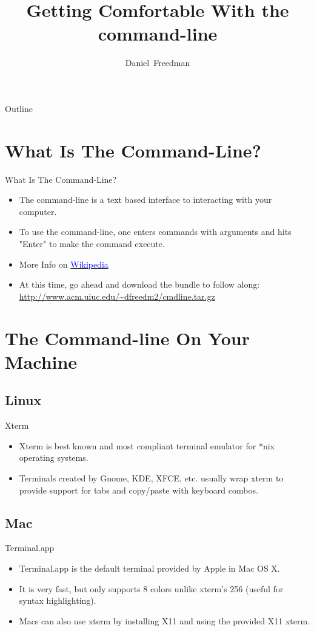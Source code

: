 \documentclass[10pt]{beamer}
\title[Getting Comfortable With the command-line]
{Getting Comfortable With the command-line}
\author[ACM Student Lecture Series]{Daniel~Freedman}
\date[September 14th, 2010]
\begin{document}
\begin{frame}
  \titlepage
\end{frame}

\begin{frame}[shrink]{Outline}
  \tableofcontents
\end{frame}

\section{What Is The Command-Line?}
\begin{frame}{What Is The Command-Line?}
  \begin{itemize}
  \item The command-line is a text based interface to interacting with your computer.
  \item To use the command-line, one enters commands with arguments and hits "Enter" to make the command execute.
  \item More Info on \href{http://en.wikipedia.org/wiki/Command-line\_interface}{\textcolor{blue}{Wikipedia}}
  \item At this time, go ahead and download the bundle to follow along: \url{http://www.acm.uiuc.edu/~dfreedm2/cmdline.tar.gz}
  \end{itemize}
\end{frame}

\section{The Command-line On Your Machine}

\subsection{Linux}
\begin{frame}{Xterm}
\begin{itemize}
\item Xterm is best known and most compliant terminal emulator for *nix operating systems.
\item Terminals created by Gnome, KDE, XFCE, etc. usually wrap xterm to provide support for tabs and copy/paste with keyboard combos.
\end{itemize}
\end{frame}

\subsection{Mac}
\begin{frame}{Terminal.app}
\begin{itemize}
\item Terminal.app is the default terminal provided by Apple in Mac OS X.
\item It is very fast, but only supports 8 colors unlike xterm's 256 (useful for syntax highlighting).
\item Macs can also use xterm by installing X11 and using the provided X11 xterm.
\end{itemize}
\end{frame}
\end{document}

